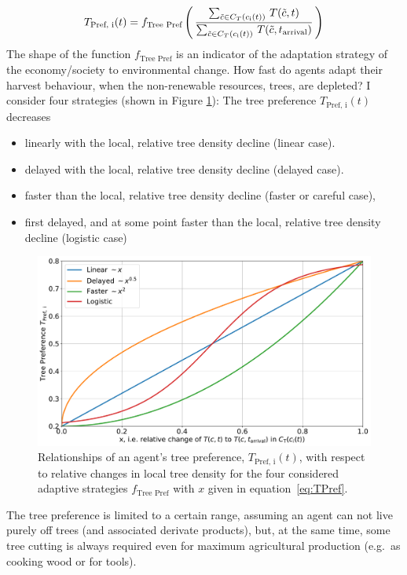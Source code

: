 \begin{equation}\label{eq:TPref}
T_\text{Pref, i}(t) = f_\text{Tree Pref}\left( \, \frac{\sum_{\tilde{c} \in C_{T}(c_{\rm i}(t)) } \, T(\tilde{c}, t)}{\sum_{\tilde{c} \in C_{T}(c_{\rm i}(t))} \, T(\tilde{c}, t_\text{arrival}) } \, \right)
\end{equation}
The shape of the function $f_\text{Tree Pref}$ is an indicator of the adaptation strategy of the economy/society to environmental change. How fast do agents adapt their harvest behaviour, when the non-renewable resources, trees, are depleted?
I consider four strategies (shown in Figure \ref{fig:TPref_T}): The tree preference $T_\text{Pref, i}(t)$ decreases
\begin{itemize}
	\item linearly with the local, relative tree density decline (linear case).  
	\item delayed with the local, relative tree density decline (delayed case).
	\item faster than the local, relative tree density decline (faster or careful case),
	\item first delayed, and at some point faster than the local, relative tree density decline (logistic case) 
\end{itemize}
\begin{figure}
	\centering
	\includegraphics[width=\textwidth]{images/TPref}
	\caption{Relationships of an agent's tree preference, $T_\text{Pref, i}(t)$, with respect to relative changes in local tree density for the four considered adaptive strategies $f_\text{Tree Pref}$ with $x$ given in equation~\ref{eq:TPref}.}
	\label{fig:TPref_T}
\end{figure}
The tree preference is limited to a certain range, assuming an agent can not live purely off trees (and associated derivate products), but, at the same time, some tree cutting is always required even for maximum agricultural production (e.g.\ as cooking wood or for tools). 
